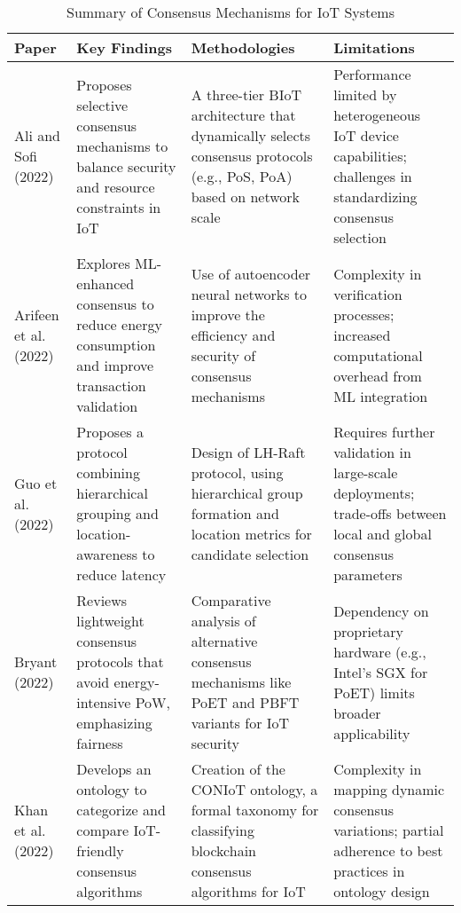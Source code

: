 \documentclass[12pt,onecolumn]{IEEEtran} %
\newcommand{\fitToPage}[1]{\begin{adjustbox}{max width=\textwidth}#1\end{adjustbox}}
\renewcommand{\arraystretch}{1.2} %
\begin{document}
\begin{table}[H]
\caption{Summary of Consensus Mechanisms for IoT Systems}
\label{tab:summary_consensus}
\centering
\fitToPage{
\begingroup
\setlength{\tabcolsep}{4pt}
\renewcommand{\arraystretch}{1.15}
\footnotesize
\begin{tabularx}{\textwidth}{@{}P{0.18\textwidth}YYY@{}}
\toprule
\textbf{Paper} & \textbf{Key Findings} & \textbf{Methodologies} & \textbf{Limitations} \\
\midrule
Ali and Sofi (2022) & Proposes selective consensus mechanisms to balance security and resource constraints in IoT & A three-tier BIoT architecture that dynamically selects consensus protocols (e.g., PoS, PoA) based on network scale & Performance limited by heterogeneous IoT device capabilities; challenges in standardizing consensus selection \\
\addlinespace
Arifeen et al. (2022) & Explores ML-enhanced consensus to reduce energy consumption and improve transaction validation & Use of autoencoder neural networks to improve the efficiency and security of consensus mechanisms & Complexity in verification processes; increased computational overhead from ML integration \\
\addlinespace
Guo et al. (2022) & Proposes a protocol combining hierarchical grouping and location-awareness to reduce latency & Design of LH-Raft protocol, using hierarchical group formation and location metrics for candidate selection & Requires further validation in large-scale deployments; trade-offs between local and global consensus parameters \\
\addlinespace
Bryant (2022) & Reviews lightweight consensus protocols that avoid energy-intensive PoW, emphasizing fairness & Comparative analysis of alternative consensus mechanisms like PoET and PBFT variants for IoT security & Dependency on proprietary hardware (e.g., Intel's SGX for PoET) limits broader applicability \\
\addlinespace
Khan et al. (2022) & Develops an ontology to categorize and compare IoT-friendly consensus algorithms & Creation of the CONIoT ontology, a formal taxonomy for classifying blockchain consensus algorithms for IoT & Complexity in mapping dynamic consensus variations; partial adherence to best practices in ontology design \\
\bottomrule
\end{tabularx}
\endgroup
}
\end{table}
\clearpage
\end{document}
